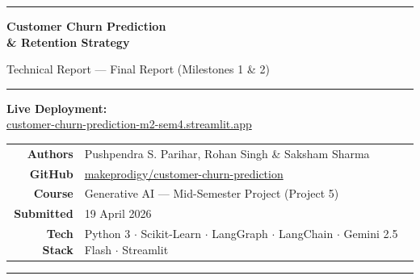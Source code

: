 \documentclass[12pt,a4paper]{article}
\begin{document}

\begin{titlepage}
    \centering
    \vspace*{1cm}
    {\color{primary}\rule{\linewidth}{2pt}}
    \vspace{0.5cm}

    {\LARGE\bfseries\color{primary} Customer Churn Prediction \\ \& Retention Strategy}

    \vspace{0.3cm}
    {\large\color{gray} Technical Report --- Final Report (Milestones 1 \& 2)}

    \vspace{0.3cm}
    {\color{primary}\rule{\linewidth}{0.5pt}}

    \vspace{1.5cm}
    \begin{tcolorbox}[colback=lightgray, colframe=primary!40, width=0.85\linewidth]
        \centering
        \textbf{Live Deployment:}\\[4pt]
        \href{https://customer-churn-prediction-m2-sem4.streamlit.app/}
             {\ttfamily\small customer-churn-prediction-m2-sem4.streamlit.app}
    \end{tcolorbox}

    \vspace{1cm}
    \begin{tabular}{rl}
        \textbf{Authors}     & Pushpendra S. Parihar, Rohan Singh \& Saksham Sharma \\[4pt]
        \textbf{GitHub}      & \href{https://github.com/makeprodigy/customer-churn-prediction}{makeprodigy/customer-churn-prediction} \\[4pt]
        \textbf{Course}      & Generative AI --- Mid-Semester Project (Project 5) \\[4pt]
        \textbf{Submitted}   & 19 April 2026 \\[4pt]
        \textbf{Tech Stack}  & Python 3 $\cdot$ Scikit-Learn $\cdot$ LangGraph $\cdot$ LangChain $\cdot$ Gemini 2.5 Flash $\cdot$ Streamlit \\
    \end{tabular}

    \vfill
    {\color{primary}\rule{\linewidth}{2pt}}
\end{titlepage}
\end{document}
